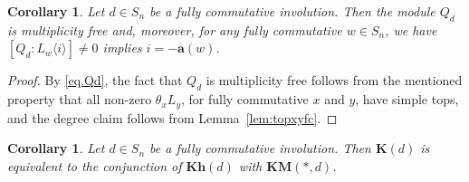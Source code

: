 \documentclass[a4paper]{amsart}
\newtheorem{corollary}[theorem]{Corollary}
\begin{document}
\begin{corollary}\label{cor:LLLfc}
Let $d\in S_n$ be a fully commutative involution.
Then the module $Q_d$ is multiplicity free and, moreover,
for any fully commutative $w\in S_n$, we have
$[Q_d:L_w\langle i\rangle]\neq 0$ implies $i=-\mathbf{a}(w)$. 
\end{corollary}

\begin{proof}
By \eqref{eq.Qd}, the fact that  $Q_d$ is multiplicity free follows from
the mentioned property that all non-zero 
$\theta_x L_y$, for fully commutative $x$ and $y$, have simple tops, and the degree claim follows from Lemma~\ref{lem:topxyfc}.
\end{proof}

\begin{corollary}\label{cor:kmmfc}
Let $d\in S_n$ be a fully commutative involution.
Then $\mathbf{K}(d)$ is equivalent to
the conjunction of $\mathbf{Kh}(d)$ with $\mathbf{KM}(*,d)$.
\end{corollary}
\end{document}

